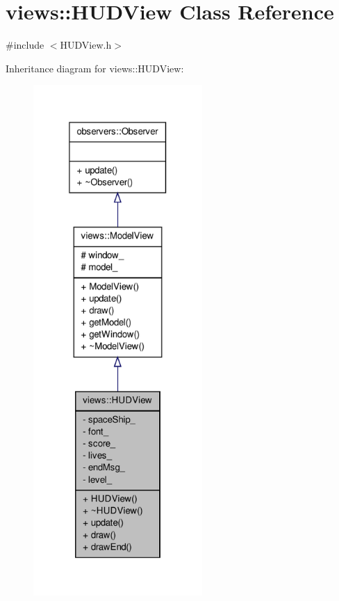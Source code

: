 \hypertarget{classviews_1_1HUDView}{\section{views\-:\-:\-H\-U\-D\-View \-Class \-Reference}
\label{d0/d97/classviews_1_1HUDView}
}


{\ttfamily \#include $<$\-H\-U\-D\-View.\-h$>$}



\-Inheritance diagram for views\-:\-:\-H\-U\-D\-View\-:
\nopagebreak
\begin{figure}[H]
\begin{center}
\leavevmode
\includegraphics[height=550pt]{d7/d9b/classviews_1_1HUDView__inherit__graph}
\end{center}
\end{figure}


